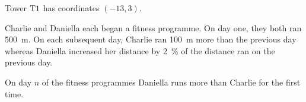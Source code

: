 \documentclass{src/ib}
\begin{document}
\begin{questions}
Tower $\mathrm T1$ has coordinates $(-13,3)$.

\bigskip
\continue
\makeanswerbox
\newpage

\question Charlie and Daniella each began a fitness programme. On day one, they both ran \SI{500}{\m}. On each subsequent day, Charlie ran \SI{100}{\m} more than the previous day whereas Daniella increased her distance by \SI{2}{\percent} of the distance ran on the previous day.


On day $n$ of the fitness programmes Daniella runs more than Charlie for the first time.


\makeanswerbox

\end{questions}

\fillbooklet

\end{document}
